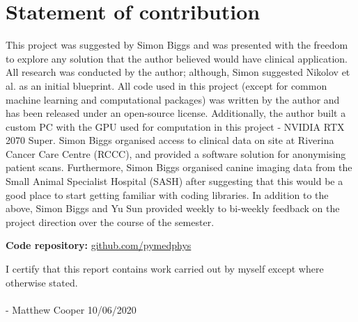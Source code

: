\chapter{Statement of contribution}
\label{ch:contribution}

This project was suggested by Simon Biggs and was presented with the freedom to explore any solution that the author believed would have clinical application. All research was conducted by the author; although, Simon suggested Nikolov et al. as an initial blueprint. All code used in this project (except for common machine learning and computational packages) was written by the author and has been released under an open-source license. Additionally, the author built a custom PC with the GPU used for computation in this project - NVIDIA RTX 2070 Super. Simon Biggs organised access to clinical data on site at Riverina Cancer Care Centre (RCCC), and provided a software solution for anonymising patient scans. Furthermore, Simon Biggs organised canine imaging data from the Small Animal Specialist Hospital (SASH) after suggesting that this would be a good place to start getting familiar with coding libraries. In addition to the above, Simon Biggs and Yu Sun provided weekly to bi-weekly feedback on the project direction over the course of the semester.


\textbf{Code repository:} \href{https://github.com/pymedphys/pymedphys}{github.com/pymedphys}


\vspace{1cm}
\vspace{1cm}

I certify that this report contains work carried out by myself except where otherwise
stated.
\\
\\
- Matthew Cooper     10/06/2020
\\
\\
